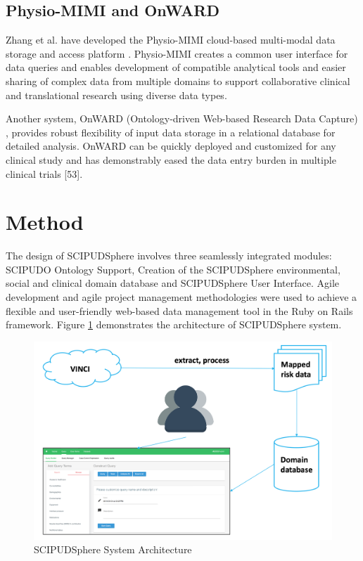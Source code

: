 \documentclass{amia}
\begin{document}
\subsection{Physio-MIMI and OnWARD}
Zhang et al. have developed the Physio-MIMI cloud-based multi-modal data storage and access platform \cite{physiomimi}. Physio-MIMI creates a common user interface for data queries and enables development of compatible analytical tools and easier sharing of complex data from multiple domains to support collaborative clinical and translational research using diverse data types. 

Another system, OnWARD (Ontology-driven Web-based Research Data Capture) \cite{onward}, provides robust flexibility of input data storage in a relational database for detailed analysis. OnWARD can be quickly deployed and customized for any clinical study and has demonstrably eased the data entry burden in multiple clinical trials [53]. 

\section{Method}
The design of SCIPUDSphere involves three seamlessly integrated modules: SCIPUDO Ontology Support, Creation of the SCIPUDSphere environmental, social and clinical domain database and SCIPUDSphere User Interface. Agile development and agile project management methodologies were used to achieve a flexible and user-friendly web-based data management tool in the Ruby on Rails framework. Figure \ref{architecture} demonstrates the architecture of SCIPUDSphere system. 

\begin{figure}[h!]
  \centering
  \includegraphics[scale=0.4]{pics/architecture.png}
  \caption{SCIPUDSphere System Architecture}
  \label{architecture}
\end{figure}
\end{document}
